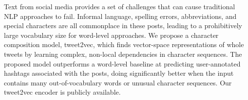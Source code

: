 Text from social media provides a set of challenges that can cause traditional NLP approaches to fail. Informal language, spelling errors, abbreviations, and special characters are all commonplace in these posts, leading to a prohibitively large vocabulary size for word-level approaches. We propose a character composition model, tweet2vec, which finds vector-space representations of whole tweets by learning complex, non-local dependencies in character sequences. The proposed model outperforms a word-level baseline at predicting user-annotated hashtags associated with the posts, doing significantly better when the input contains many out-of-vocabulary words or unusual character sequences. Our tweet2vec encoder is publicly available.
